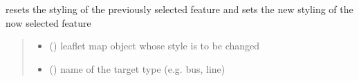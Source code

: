 \documentclass[letterpaper,10pt,english]{sphinxmanual}
\begin{document}
\begin{fulllineitems}
\label{\detokenize{docs_gui/js_api/network_editor/display_editable_network_features:resetStyle}}
\pysigstartsignatures
{}
\pysigstopsignatures
\sphinxAtStartPar
resets the styling of the previously selected feature and sets the new styling of the now selected feature
\begin{quote}\begin{description}
\begin{itemize}
\item {} 
\sphinxAtStartPar
{} () \textendash{} leaflet map object whose style is to be changed

\item {} 
\sphinxAtStartPar
{} () \textendash{} name of the target type (e.g. bus, line)

\end{itemize}

\end{description}\end{quote}

\end{fulllineitems}

\end{document}
